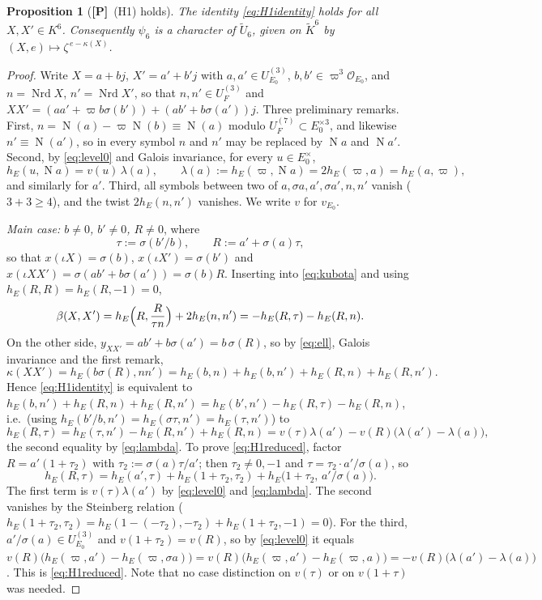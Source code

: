 \documentclass[11pt]{article}
\newcommand{\Nm}{\operatorname N}
\newcommand{\Nrd}{\operatorname{Nrd}}
\newcommand{\tU}{\widetilde U}
\newcommand{\Ocal}{\mathcal O}
\newcommand{\Ptag}{\textnormal{\textbf{[P]}}}
\theoremstyle{plain}
\newtheorem{proposition}[theorem]{Proposition}
\theoremstyle{definition}
\begin{document}
\begin{proposition}[\Ptag\ (H1) holds]\label{prop:H1}
The identity \eqref{eq:H1identity} holds for all $X,X'\in K^6$.
Consequently $\psi_6$ is a character of $\tU_6$, given on
$\tilde K^6$ by $(X,e)\mapsto\zeta^{\,e-\kappa(X)}$.
\end{proposition}
\begin{proof}
Write $X=a+bj$, $X'=a'+b'j$ with $a,a'\in U^{(3)}_{E_0}$, $b,b'\in\varpi^3\Ocal_{E_0}$,
and $n=\Nrd X$, $n'=\Nrd X'$, so that $n,n'\in U_F^{(3)}$ and
$XX'=(aa'+\varpi b\sigma(b'))+(ab'+b\sigma(a'))j$.  Three preliminary
remarks.  First, $n=\Nm(a)-\varpi\Nm(b)\equiv\Nm(a)$ modulo
$U^{(7)}_F\subset E_0^{\times3}$, and likewise $n'\equiv\Nm(a')$, so in
every symbol $n$ and $n'$ may be replaced by $\Nm a$ and $\Nm a'$.
Second, by \eqref{eq:level0} and Galois invariance, for every
$u\in E_0^\times$,
\begin{equation}\label{eq:lambda}
 h_E(u,\Nm a)=v(u)\,\lambda(a),\qquad \lambda(a):=h_E(\varpi,\Nm a)=2h_E(\varpi,a)=h_E(a,\varpi),
\end{equation}
and similarly for $a'$.  Third, all symbols between two of
$a,\sigma a,a',\sigma a',n,n'$ vanish ($3+3\ge4$), and the twist
$2h_E(n,n')$ vanishes.  We write $v$ for $v_{E_0}$.

\emph{Main case: $b\ne0$, $b'\ne0$, $R\ne0$}, where
\[
 \tau:=\sigma(b'/b),\qquad R:=a'+\sigma(a)\tau,
\]
so that $x(\iota X)=\sigma(b)$, $x(\iota X')=\sigma(b')$ and
$x(\iota XX')=\sigma(ab'+b\sigma(a'))=\sigma(b)R$.  Inserting into
\eqref{eq:kubota} and using $h_E(R,R)=h_E(R,-1)=0$,
\begin{equation}\label{eq:betaK6}
 \beta(X,X')=h_E\Bigl(R,\frac{R}{\tau n}\Bigr)+2h_E(n,n')=-h_E(R,\tau)-h_E(R,n).
\end{equation}
On the other side, $y_{XX'}=ab'+b\sigma(a')=b\,\sigma(R)$, so by
\eqref{eq:ell}, Galois invariance and the first remark,
\[
 \kappa(XX')=h_E(b\sigma(R),nn')=h_E(b,n)+h_E(b,n')+h_E(R,n)+h_E(R,n').
\]
Hence \eqref{eq:H1identity} is equivalent to
$h_E(b,n')+h_E(R,n)+h_E(R,n')=h_E(b',n')-h_E(R,\tau)-h_E(R,n)$, i.e.\ (using $h_E(b'/b,n')=h_E(\sigma\tau,n')=h_E(\tau,n')$) to
\begin{equation}\label{eq:H1reduced}
 h_E(R,\tau)=h_E(\tau,n')-h_E(R,n')+h_E(R,n)=v(\tau)\lambda(a')-v(R)\bigl(\lambda(a')-\lambda(a)\bigr),
\end{equation}
the second equality by \eqref{eq:lambda}.  To prove
\eqref{eq:H1reduced}, factor $R=a'(1+\tau_2)$ with
$\tau_2:=\sigma(a)\tau/a'$; then $\tau_2\ne0,-1$ and
$\tau=\tau_2\cdot a'/\sigma(a)$, so
\[
 h_E(R,\tau)=h_E(a',\tau)+h_E(1+\tau_2,\tau_2)+h_E\bigl(1+\tau_2,\,a'/\sigma(a)\bigr).
\]
The first term is $v(\tau)\lambda(a')$ by \eqref{eq:level0} and
\eqref{eq:lambda}.  The second vanishes by the Steinberg relation
($h_E(1+\tau_2,\tau_2)=h_E(1-(-\tau_2),-\tau_2)+h_E(1+\tau_2,-1)=0$).
For the third, $a'/\sigma(a)\in U^{(3)}_{E_0}$ and $v(1+\tau_2)=v(R)$, so
by \eqref{eq:level0} it equals
$v(R)\bigl(h_E(\varpi,a')-h_E(\varpi,\sigma a)\bigr)=v(R)\bigl(h_E(\varpi,a')-h_E(\varpi,a)\bigr)=-v(R)\bigl(\lambda(a')-\lambda(a)\bigr)$.
This is \eqref{eq:H1reduced}.  Note that no case distinction on
$v(\tau)$ or on $v(1+\tau)$ was needed.


\end{proof}
\end{document}

